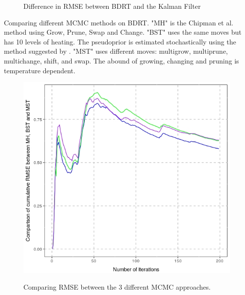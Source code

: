 \documentclass[a1paper,portrait, fontscale=0.45]{baposter}
\begin{document}
\begin{poster}
{\begin{multicols}{3}
\begin{figure}[H]
\begin{minipage}[c]{0.6\linewidth}
\label{fig:kbdiff}
\vspace{-1.7em}
\caption{Difference in RMSE between BDRT and the Kalman Filter}
\end{minipage}
\end{figure}
\end{multicols}
Comparing different MCMC methods on BDRT. \small{"MH" is the Chipman et al. method using Grow, Prune, Swap and Change. "BST" uses the same moves but has 10 levels of heating. The pseudoprior is estimated stochastically using the method suggested by \cite{geyer}. "MST" uses different moves: multigrow, multiprune, multichange, shift, and swap. The abound of growing, changing and pruning is temperature dependent.}
\begin{multicols}{3}
\begin{figure}[H]
\hspace{1em}
\begin{minipage}[c]{0.6\linewidth}
\includegraphics[width=\linewidth]{comp3rmse.jpeg}
\label{fig:comprmse}
\vspace{-1.7em}
\caption{Comparing RMSE between the 3 different MCMC approaches.}
\end{minipage}
\end{figure}
\begin{figure}[H]
\hspace{1em}
\begin{minipage}[c]{0.6\linewidth}

\end{minipage}
\end{figure}
\end{multicols}}
\end{poster}
\end{document}
